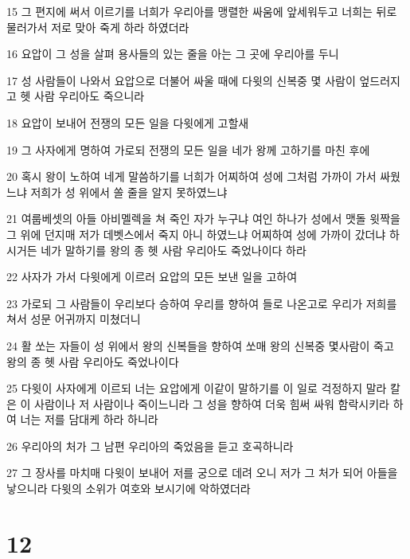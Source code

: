 \par 15 그 편지에 써서 이르기를 너희가 우리아를 맹렬한 싸움에 앞세워두고 너희는 뒤로 물러가서 저로 맞아 죽게 하라 하였더라
\par 16 요압이 그 성을 살펴 용사들의 있는 줄을 아는 그 곳에 우리아를 두니
\par 17 성 사람들이 나와서 요압으로 더불어 싸울 때에 다윗의 신복중 몇 사람이 엎드러지고 헷 사람 우리아도 죽으니라
\par 18 요압이 보내어 전쟁의 모든 일을 다윗에게 고할새
\par 19 그 사자에게 명하여 가로되 전쟁의 모든 일을 네가 왕께 고하기를 마친 후에
\par 20 혹시 왕이 노하여 네게 말씀하기를 너희가 어찌하여 성에 그처럼 가까이 가서 싸웠느냐 저희가 성 위에서 쏠 줄을 알지 못하였느냐
\par 21 여룹베셋의 아들 아비멜렉을 쳐 죽인 자가 누구냐 여인 하나가 성에서 맷돌 윗짝을 그 위에 던지매 저가 데벳스에서 죽지 아니 하였느냐 어찌하여 성에 가까이 갔더냐 하시거든 네가 말하기를 왕의 종 헷 사람 우리아도 죽었나이다 하라
\par 22 사자가 가서 다윗에게 이르러 요압의 모든 보낸 일을 고하여
\par 23 가로되 그 사람들이 우리보다 승하여 우리를 향하여 들로 나온고로 우리가 저희를 쳐서 성문 어귀까지 미쳤더니
\par 24 활 쏘는 자들이 성 위에서 왕의 신복들을 향하여 쏘매 왕의 신복중 몇사람이 죽고 왕의 종 헷 사람 우리아도 죽었나이다
\par 25 다윗이 사자에게 이르되 너는 요압에게 이같이 말하기를 이 일로 걱정하지 말라 칼은 이 사람이나 저 사람이나 죽이느니라 그 성을 향하여 더욱 힘써 싸워 함락시키라 하여 너는 저를 담대케 하라 하니라
\par 26 우리아의 처가 그 남편 우리아의 죽었음을 듣고 호곡하니라
\par 27 그 장사를 마치매 다윗이 보내어 저를 궁으로 데려 오니 저가 그 처가 되어 아들을 낳으니라 다윗의 소위가 여호와 보시기에 악하였더라

\chapter{12}

